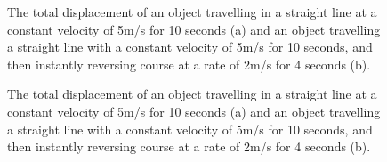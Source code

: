 \ifanalysis\begin{figure}
\centering
\qquad
{}
\caption{The total displacement of an object travelling in a straight line at a constant velocity of 5m/s for 10 seconds (a) and an object  travelling a straight line with a constant velocity of 5m/s for 10 seconds, and then instantly reversing course at a rate of 2m/s for 4 seconds (b). }
\end{figure}\fi

\ifcalculus\begin{figure}[h]
\centering
\qquad
{}
\caption{The total displacement of an object travelling in a straight line at a constant velocity of 5m/s for 10 seconds (a) and an object  travelling a straight line with a constant velocity of 5m/s for 10 seconds, and then instantly reversing course at a rate of 2m/s for 4 seconds (b). }
\end{figure}
\fi

